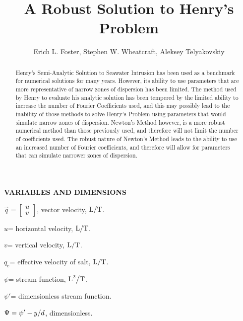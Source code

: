 \documentclass{article}
\title{A Robust Solution to Henry's Problem}
\author{Erich L. Foster, Stephen W. Wheatcraft, Aleksey Telyakovskiy}
\begin{document}
\maketitle

\begin{abstract}
Henry's Semi-Analytic Solution to Seawater Intrusion has been used as a 
benchmark for numerical solutions for many years. However, its ability to use 
parameters that are more representative of narrow zones of dispersion has been 
limited. The method used by Henry to evaluate his analytic solution has been 
tempered by the limited ability to increase the number of Fourier Coefficients 
used, and this may possibly lead to the inability of those methods to solve 
Henry's Problem using parameters that would simulate narrow zones of dispersion. 
Newton's Method however, is a more robust numerical method than those previously 
used, and therefore will not limit the number of coefficients used. The robust 
nature of Newton's Method leads to the ability to use an increased number of 
Fourier coefficients, and therefore will allow for parameters that can simulate 
narrower zones of dispersion.
\end{abstract}


 \textbf{VARIABLES AND DIMENSIONS}

$\stackrel{\rightharpoonup}{q}=\left[\begin{array}{c} {u} \\ {v}
\end{array} \right]$, vector velocity, ${ \text{L} \mathord{\left/ {\vphantom {{\rm
L} \text{T} }} \right. \kern-\nulldelimiterspace} \text{T} } $.

$u$= horizontal velocity, ${ \text{L} \mathord{\left/ {\vphantom { \text{L} \text{T} }}
\right. \kern-\nulldelimiterspace} \text{T} } $.

$v$= vertical velocity, ${ \text{L} \mathord{\left/ {\vphantom { \text{L} \text{T} }}
\right. \kern-\nulldelimiterspace} \text{T} } $.

$q_{e} $= effective velocity of salt, ${ \text{L} \mathord{\left/ {\vphantom {
 \text{L T} }} \right. \kern-\nulldelimiterspace} \text{T} } $.

$\psi $= stream function, ${ \text{L} ^{2} \mathord{\left/ {\vphantom {
 \text{L} ^{2} \text{T} }} \right. \kern-\nulldelimiterspace} \text{T} } $.

$\psi '$= dimensionless stream function.

$\Psi =\psi '-{y\mathord{\left/ {\vphantom {y d}} \right.
\kern-\nulldelimiterspace} d} $, dimensionless.
\end{document}
